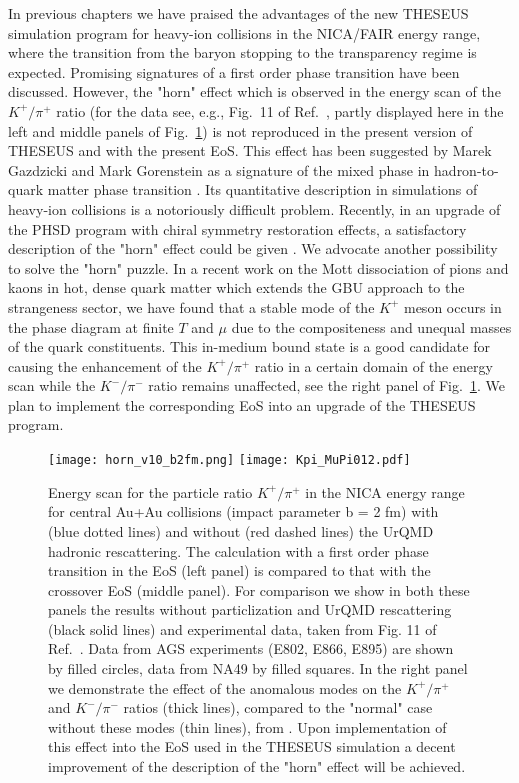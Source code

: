 \documentclass{webofc}
\begin{document}
In previous chapters we have praised the advantages of the new THESEUS simulation program for heavy-ion collisions in the NICA/FAIR energy range, where the transition from the baryon stopping to the transparency regime is expected. Promising signatures of a first order phase transition have been discussed. 
However, the "horn" effect which is observed in the energy scan of the  $K^+/\pi^+$ ratio 
(for the data see, e.g., Fig.~11 of Ref.~\cite{Ivanov:2013yqa}, partly displayed here in the left and middle panels of Fig.~\ref{fig-7}) is not reproduced in the present version of THESEUS and with the present EoS.
This effect has been suggested by Marek Gazdzicki and Mark Gorenstein as a  signature of the mixed phase in hadron-to-quark matter phase transition \cite{Gazdzicki:1998vd}.
Its quantitative description in simulations of heavy-ion collisions is a notoriously difficult problem. 
Recently, in an upgrade of the PHSD program with chiral symmetry restoration effects, a
satisfactory description of the "horn" effect could be given \cite{Palmese:2016rtq}.
We advocate another possibility to solve the "horn" puzzle.
In a recent work on the Mott dissociation of pions and kaons in hot, dense quark matter 
\cite{Dubinin:2016wvt} which extends the GBU approach \cite{Schmidt:1990,Hufner:1994ma,Blaschke:2013zaa} to the strangeness sector, we have found that a stable mode of the $K^+$ meson occurs in the phase diagram at finite $T$ and $\mu$ due to the compositeness and unequal masses of the quark constituents. 
This in-medium bound state is a good candidate for causing the enhancement of the $K^+/\pi^+$ ratio 
in a certain domain of the energy scan while the $K^-/\pi^-$ ratio remains unaffected, see the right panel 
of Fig.~\ref{fig-7}.
We plan to implement the corresponding EoS into an upgrade of the THESEUS program. 

\begin{figure}[!htb]
\centering
\texttt{[image: horn\_v10\_b2fm.png]}
\texttt{[image: Kpi\_MuPi012.pdf]}
\caption{Energy scan for the particle ratio $K^+/\pi^+$ in the NICA energy range for central Au+Au collisions (impact parameter b = 2 fm) with (blue dotted lines) and without (red dashed lines) the UrQMD hadronic rescattering. 
The calculation with a first order phase transition in the EoS (left panel) is
compared to that with the crossover EoS (middle panel). 
For comparison we show in both these panels the results without particlization and UrQMD rescattering
(black solid lines) and experimental data, taken from Fig. 11 of Ref.~\cite{Ivanov:2013yqa}.
Data from AGS experiments (E802, E866, E895) are shown by filled circles, data from NA49 by filled squares.
In the right panel we demonstrate the effect of the anomalous modes on the $K^+/\pi^+$ and $K^-/\pi^-$ ratios (thick lines), compared to the "normal" case without these modes (thin lines), from \cite{Dubinin:2016wvt}.
Upon implementation of this effect into the EoS used in the THESEUS simulation a decent improvement 
of the description of the "horn" effect will be achieved.
}
\label{fig-7}       %
\end{figure}
\end{document}
